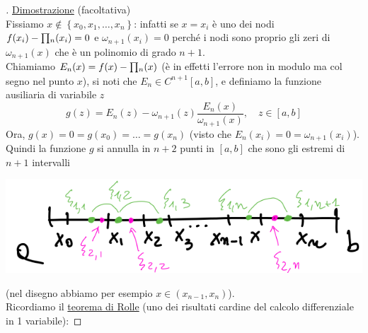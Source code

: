 \begin{proof}[\unskip\nopunct]
\uline{Dimostrazione} (facoltativa)\\
Fissiamo $x \notin \left\{ x_0, x_1, \dots, x_n \right\}$: infatti se $x=x_i$ è uno dei nodi $f(x_i) - \begin{matrix}\prod\end{matrix}_n (x_i) = 0$ e $\omega_{n+1}(x_i)=0$ perché i nodi sono proprio gli zeri di $\omega_{n+1}(x)$ che è un polinomio di grado $n+1$.\\
Chiamiamo $E_n(x) = f(x) - \begin{matrix}\prod\end{matrix}_n (x)$ (è in effetti l'errore non in modulo ma col segno nel punto $x$), si noti che $E_n \in C^{n+1}[a,b]$, e definiamo la funzione ausiliaria di variabile $z$
\[ g(z) = E_n(z) - \omega_{n+1}(z) \frac{E_n(x)}{\omega_{n+1}(x)}, \quad z \in [a,b] \]
Ora, $g(x) = 0 = g(x_0) = \dotso = g(x_n)$ (visto  che $E_n(x_i) = 0 = \omega_{n+1}(x_i)$). Quindi la funzione $g$ si annulla in $n+2$ punti in $[a,b]$ che sono gli estremi di $n+1$ intervalli
\begin{center}
    \includegraphics[scale=0.5]{foto/img1_pag6}
\end{center}
(nel disegno abbiamo per esempio $x \in (x_{n-1}, x_n)$).\\
Ricordiamo il \uline{teorema di Rolle} (uno dei risultati cardine del calcolo differenziale in 1 variabile):


\end{proof}
